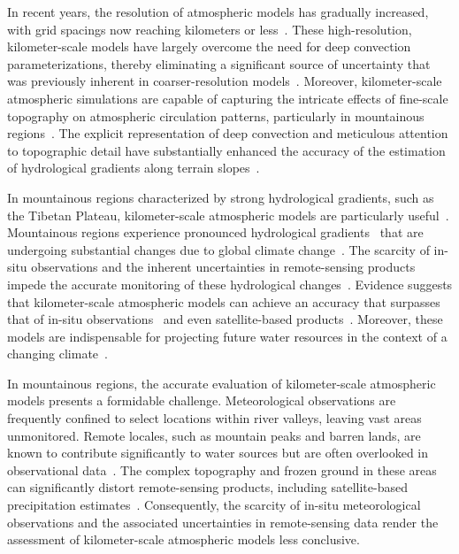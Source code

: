 \documentclass[draft]{agujournal2019}
\begin{document}
In recent years, the resolution of atmospheric models has gradually increased, with grid spacings now reaching kilometers or less~\cite{clark2016MA, prein2015RG, stevens2019PEPS, tang2023GMD, li2024ESSD}. These high-resolution, kilometer-scale models have largely overcome the need for deep convection parameterizations, thereby eliminating a significant source of uncertainty that was previously inherent in coarser-resolution models~\cite{prein2015RG, clark2016MA, mooney2017JC}. Moreover, kilometer-scale atmospheric simulations are capable of capturing the intricate effects of fine-scale topography on atmospheric circulation patterns, particularly in mountainous regions~\cite{lin2018CD, zhou2021CD, yuan2023AR, sugimoto2021JHM, ma2023CD, li2022AAS}. The explicit representation of deep convection and meticulous attention to topographic detail have substantially enhanced the accuracy of the estimation of hydrological gradients along terrain slopes~\cite{jiang2022HESS, sugimoto2021JHM, ma2023CD}.

In mountainous regions characterized by strong hydrological gradients, such as the Tibetan Plateau, kilometer-scale atmospheric models are particularly useful~\cite{prein2023CD}. Mountainous regions experience pronounced hydrological gradients~\cite{immerzeel2014WRR} that are undergoing substantial changes due to global climate change~\cite{yao2019BAMS, cui2023NC, wang2021NCC, kraaijenbrink2021NCC}. The scarcity of in-situ observations and the inherent uncertainties in remote-sensing products impede the accurate monitoring of these hydrological changes~\cite{miao2024PNAS}. Evidence suggests that kilometer-scale atmospheric models can achieve an accuracy that surpasses that of in-situ observations~\cite{lundquist2019BAMS} and even satellite-based products~\cite{jiang2022IJC}. Moreover, these models are indispensable for projecting future water resources in the context of a changing climate~\cite{prein2023CD}.

In mountainous regions, the accurate evaluation of kilometer-scale atmospheric models presents a formidable challenge. Meteorological observations are frequently confined to select locations within river valleys, leaving vast areas unmonitored. Remote locales, such as mountain peaks and barren lands, are known to contribute significantly to water sources but are often overlooked in observational data~\cite{miao2024PNAS}. The complex topography and frozen ground in these areas can significantly distort remote-sensing products, including satellite-based precipitation estimates~\cite{behrangi2014JAMC}. Consequently, the scarcity of in-situ meteorological observations and the associated uncertainties in remote-sensing data render the assessment of kilometer-scale atmospheric models less conclusive.
\end{document}
